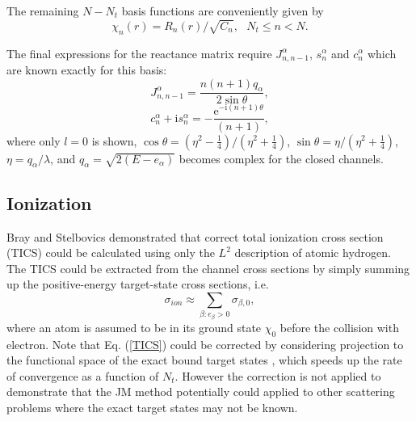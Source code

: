 \documentclass[aip,pra,showpacs,aps,twocolumn,groupedaddress,floatfix]{revtex4}
\newcommand{\beq}{\begin{equation}}
\newcommand{\eeq}{\end{equation}}
\begin{document}
The remaining $N-N_t$ basis functions are conveniently given by
\beq
\chi_n(r) = R_n(r) / \sqrt{C_n}, \ \ \ N_t \le n < N.
\eeq

The final expressions for the reactance matrix require  $J_{n,n-1}^{\alpha}$, $s_n^{\alpha}$ and $c_n^{\alpha}$ which are known exactly for this basis:
\beq
J_{n,n-1}^{\alpha}=\frac{n(n+1) q_{\alpha}}{2 \sin\theta},
\eeq
\beq
c_n^{\alpha}+\mbox{i}s_n^{\alpha}
= -\frac{\mbox{e}^{-\mbox{i}(n+1)\theta}}{(n+1) },
\eeq
where only $l=0$ is shown, $\cos\theta=(\eta^2-\frac{1}{4})/(\eta^2+\frac{1}{4})$, $\sin\theta=\eta/(\eta^2+\frac{1}{4})$, $\eta=q_{\alpha}/\lambda$, and $q_{\alpha}=\sqrt{2(E-e_{\alpha})}$ becomes complex for the closed channels.


\subsection{Ionization}
Bray and Stelbovics \cite{BS93l} demonstrated that correct total ionization cross section (TICS) could be calculated using only the $L^2$ description of atomic hydrogen. The TICS could be extracted from the channel cross sections by simply summing up the positive-energy target-state cross sections, i.e.
\beq
\sigma_{ion} \approx \sum_{\beta : e_\beta > 0} \sigma_{\beta, 0}, \label{TICS}
\eeq
where an atom is assumed to be in its ground state $\chi_0$ before the collision with electron. Note that Eq. (\ref{TICS}) could be corrected by considering projection to the functional space of the exact bound target states \cite{BS93l}, which speeds up the rate of convergence as a function of $N_t$.
However the correction is not applied to demonstrate that the JM method potentially could applied to other scattering problems where the exact target states may not be known.
\end{document}
